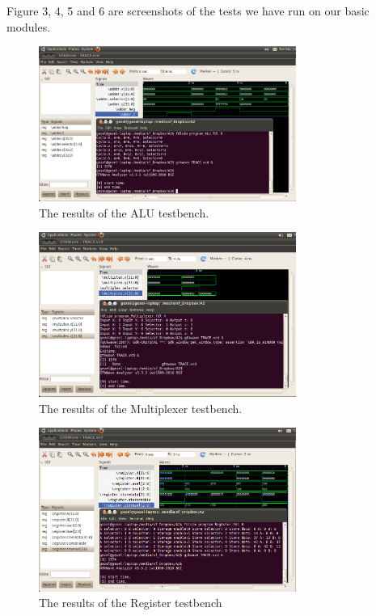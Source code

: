 \documentclass[12pt,a4paper]{article}
\begin{document}
Figure 3, 4, 5 and 6 are screenshots of the tests we have run on our basic modules.

\begin{figure}[h!]
  \centering
    \includegraphics[width=0.75\textwidth]{results_ALU.png}
  \caption{The results of the ALU testbench.}
\end{figure}

\begin{figure}[h!]
  \centering
    \includegraphics[width=0.75\textwidth]{results_Multiplexer.png}
  \caption{The results of the Multiplexer testbench.}
\end{figure}

\begin{figure}[h!]
  \centering
    \includegraphics[width=0.75\textwidth]{results_Register.png}
  \caption{The results of the Register testbench}
\end{figure}
\end{document}

